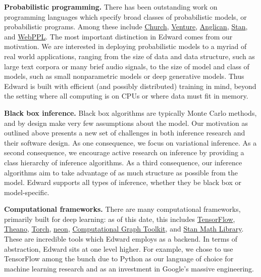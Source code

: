 \textbf{Probabilistic programming.}
There has been outstanding work on programming languages which specify
broad classes of probabilistic models, or probabilistic
programs. Among these include
\href{http://projects.csail.mit.edu/church/wiki/Church}{Church},
\href{http://probcomp.csail.mit.edu/venture/}{Venture},
\href{http://www.robots.ox.ac.uk/~fwood/anglican/literature/index.html}{Anglican},
\href{http://mc-stan.org}{Stan}, and
\href{http://webppl.org}{WebPPL}.
The most important distinction in Edward comes from our motivation.
We are interested in deploying probabilistic models to a myriad of
real world applications, ranging from the size of data and
data structure, such as large text corpora or many brief audio signals,
to the size of model and class of models, such as small nonparametric
models or deep generative models.
Thus Edward is built with efficient (and possibly distributed)
training in mind, beyond the setting where all computing is on CPUs
or where data must fit in memory.


\textbf{Black box inference.}
Black box algorithms are typically Monte Carlo methods, and
by design make very few assumptions about the model.
Our motivation as outlined above presents a new set of
challenges in both inference research and their software design.
As one consequence, we focus on variational inference.
As a second consequence, we encourage active research
on inference by providing a class hierarchy of inference algorithms.
As a third consequence, our inference
algorithms aim to take advantage of as much structure as possible from
the model. Edward supports all types of inference, whether they
be black box or model-specific.

\textbf{Computational frameworks.}
There are many computational frameworks, primarily built for deep
learning: as of this date, this includes
\href{https://www.tensorflow.org}{TensorFlow},
\href{http://deeplearning.net/software/theano/}{Theano},
\href{http://torch.ch}{Torch},
\href{https://github.com/NervanaSystems/neon}{neon},
\href{http://rll.berkeley.edu/cgt/}{Computational Graph Toolkit}, and
\href{https://github.com/stan-dev/math}{Stan Math Library}. These are
incredible tools which Edward employs as a backend. In
terms of abstraction, Edward sits at one level higher. For example,
we chose to use TensorFlow among the bunch due to Python as our language
of choice for machine learning research and as an investment in Google's
massive engineering.

